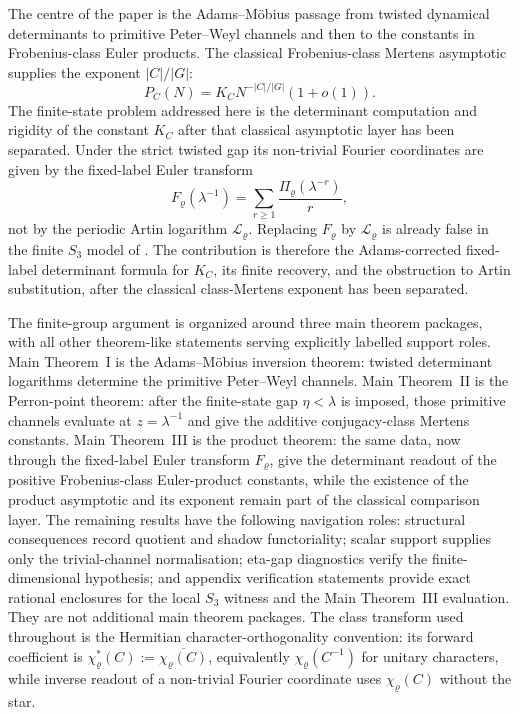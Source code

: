 \documentclass[11pt,a4paper]{amsart}
\theoremstyle{plain}
\theoremstyle{definition}
\theoremstyle{remark}
\begin{document}
The centre of the paper is the Adams--M\"obius passage from twisted
dynamical determinants to primitive Peter--Weyl channels and then to the
constants in Frobenius-class Euler products.  The classical
Frobenius-class Mertens asymptotic supplies the exponent
\(|C|/|G|\):
\[
  P_C(N)=K_C N^{-|C|/|G|}(1+o(1)).
\]
The finite-state problem addressed here is the determinant computation and
rigidity of the constant \(K_C\) after that classical asymptotic layer has
been separated.  Under the strict twisted gap its non-trivial Fourier
coordinates are given by the fixed-label Euler transform
\[
  F_\varrho(\lambda^{-1})
  =\sum_{r\ge1}\frac{\Pi_\varrho(\lambda^{-r})}{r},
\]
not by the periodic Artin logarithm \(\mathcal L_\varrho\).  Replacing
\(F_\varrho\) by \(\mathcal L_\varrho\) is already false in the finite
\(S_3\) model of .  The contribution is
therefore the Adams-corrected fixed-label determinant formula for
\(K_C\), its finite recovery, and the obstruction to Artin substitution,
after the classical class-Mertens exponent has been separated.

The finite-group argument is organized around three main theorem packages,
with all other theorem-like statements serving explicitly labelled support
roles.  Main Theorem~I is the Adams--M\"obius inversion theorem: twisted
determinant logarithms determine the primitive Peter--Weyl channels.  Main
Theorem~II is the Perron-point theorem: after the finite-state gap
\(\eta<\lambda\) is imposed, those primitive channels evaluate at
\(z=\lambda^{-1}\) and give the additive conjugacy-class Mertens constants.
Main Theorem~III is the product theorem: the same data, now through the
fixed-label Euler transform \(F_\varrho\), give the determinant readout of the
positive Frobenius-class Euler-product constants, while the existence of the
product asymptotic and its exponent remain part of the classical comparison
layer.  The remaining results have the following navigation roles: structural
consequences record quotient and shadow functoriality; scalar support supplies
only the trivial-channel normalisation; eta-gap diagnostics verify the
finite-dimensional hypothesis; and appendix verification statements provide
exact rational enclosures for the local \(S_3\) witness and the Main
Theorem~III evaluation.  They are not additional main theorem packages.
The class transform used throughout is
the Hermitian character-orthogonality convention: its forward coefficient
is \(\chi_\varrho^\ast(C):=\overline{\chi_\varrho(C)}\), equivalently
\(\chi_\varrho(C^{-1})\) for unitary characters, while inverse readout of a
non-trivial Fourier coordinate uses \(\chi_\varrho(C)\) without the star.
\end{document}
